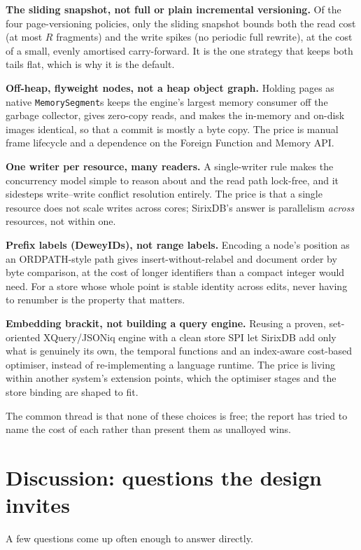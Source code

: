 \documentclass[11pt,a4paper,oneside]{report}
\theoremstyle{sirixthm}
\newcommand{\code}[1]{\texttt{#1}}
\begin{document}
\textbf{The sliding snapshot, not full or plain incremental versioning.} Of the four page-versioning
policies, only the sliding snapshot bounds both the read cost (at most $R$ fragments) and the write
spikes (no periodic full rewrite), at the cost of a small, evenly amortised carry-forward. It is the one
strategy that keeps both tails flat, which is why it is the default.

\textbf{Off-heap, flyweight nodes, not a heap object graph.} Holding pages as native
\code{MemorySegment}s keeps the engine's largest memory consumer off the garbage collector, gives
zero-copy reads, and makes the in-memory and on-disk images identical, so that a commit is mostly a byte
copy. The price is manual frame lifecycle and a dependence on the Foreign Function and Memory API.

\textbf{One writer per resource, many readers.} A single-writer rule makes the concurrency model simple
to reason about and the read path lock-free, and it sidesteps write--write conflict resolution entirely.
The price is that a single resource does not scale writes across cores; SirixDB's answer is parallelism
\emph{across} resources, not within one.

\textbf{Prefix labels (DeweyIDs), not range labels.} Encoding a node's position as an ORDPATH-style path
gives insert-without-relabel and document order by byte comparison, at the cost of longer identifiers
than a compact integer would need. For a store whose whole point is stable identity across edits, never
having to renumber is the property that matters.

\textbf{Embedding brackit, not building a query engine.} Reusing a proven, set-oriented XQuery/JSONiq
engine with a clean store SPI let SirixDB add only what is genuinely its own, the temporal functions and
an index-aware cost-based optimiser, instead of re-implementing a language runtime. The price is living
within another system's extension points, which the optimiser stages and the store binding are shaped to
fit.

The common thread is that none of these choices is free; the report has tried to name the cost of each
rather than present them as unalloyed wins.

\section{Discussion: questions the design invites}

A few questions come up often enough to answer directly.
\end{document}
